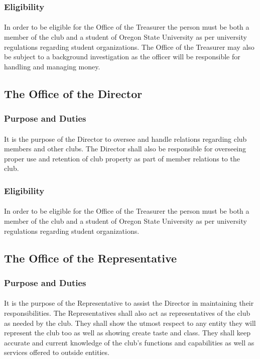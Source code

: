 \documentclass[12pt]{article}
\begin{document}
\subsubsection{Eligibility}
\paragraph{}
In order to be eligible for the Office of the Treasurer the person must be both a member of the club and a student of Oregon State University as per university regulations regarding student organizations.
The Office of the Treasurer may also be subject to a background investigation as the officer will be responsible for handling and managing money.

\subsection{The Office of the Director}
\subsubsection{Purpose and Duties}
\paragraph{}
It is the purpose of the Director to oversee and handle relations regarding club members and other clubs. The Director shall also be responsible for overseeing proper use and retention of club property as 
part of member relations to the club. 
\subsubsection{Eligibility}
\paragraph{}
In order to be eligible for the Office of the Treasurer the person must be both a member of the club and a student of Oregon State University as per university regulations regarding student organizations.

\subsection{The Office of the Representative}
\subsubsection{Purpose and Duties}
\paragraph{}
It is the purpose of the Representative to assist the Director in maintaining their responsibilities. The Representatives shall also act as representatives of the club as needed by the club. They shall show
the utmost respect to any entity they will represent the club too as well as showing create taste and class. They shall keep accurate and current knowledge of the club's functions and capabilities as well
as services offered to outside entities.
\end{document}
